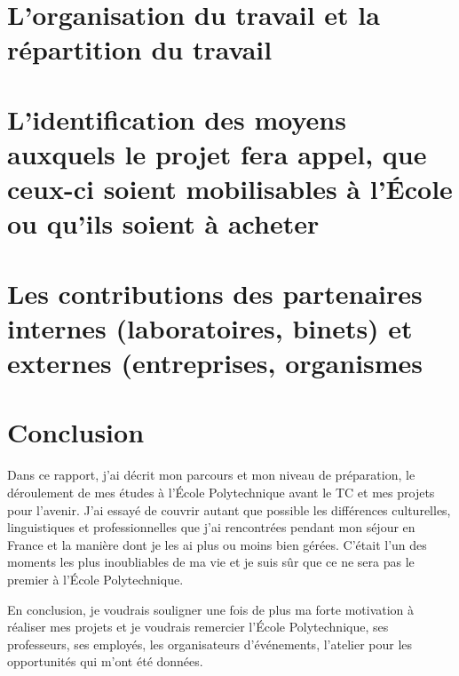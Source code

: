 \documentclass[a4paper,12pt]{article}
\begin{document}
\section{L’organisation du travail et la répartition du travail }


\section{L'identification des moyens auxquels le projet fera appel, que ceux-ci soient mobilisables à l’École ou qu’ils soient à acheter}


\section{Les contributions des partenaires internes (laboratoires, binets) et externes (entreprises, organismes}


	
\section{Conclusion}

Dans ce rapport, j'ai décrit mon parcours et mon niveau de préparation, le déroulement de mes études à l'École Polytechnique avant le TC et mes projets pour l'avenir. J'ai essayé de couvrir autant que possible les différences culturelles, linguistiques et professionnelles que j'ai rencontrées pendant mon séjour en France et la manière dont je les ai plus ou moins bien gérées. C'était l'un des moments les plus inoubliables de ma vie et je suis sûr que ce ne sera pas le premier à l'École Polytechnique.  

En conclusion, je voudrais souligner une fois de plus ma forte motivation à réaliser mes projets et je voudrais remercier l'École Polytechnique, ses professeurs, ses employés, les organisateurs d'événements, l'atelier pour les opportunités qui m'ont été données.  
\end{document}
